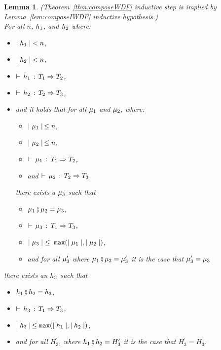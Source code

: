 \documentclass[acmtog, authorversion, acmlarge]{acmart}
\newtheorem{lem}{Lemma}
\begin{document}
\begin{lem}
  \label{lem:thm:help}
  (Theorem~\ref{thm:composeWDF} inductive step is implied by Lemma~\ref{lem:composeIWDF} inductive hypothesis.)\\
  For all $n$, $h_1$, and $h_2$ where:
  \begin{itemize}
  \item $\mid h_1 \mid \; < n$,
  \item $\mid h_2 \mid \; < n$, 
  \item $\vdash \, h_1 \, : \, T_1 \Rightarrow T_2$,
  \item $\vdash \, h_2 \, : \, T_2 \Rightarrow T_3$,
  \item and it holds that for all $\mu_1$ and $\mu_2$, where:
    \begin{itemize}
    \item $\mid \mu_1 \mid \, \le n$,
    \item $\mid \mu_2 \mid \, \le n$,
    \item $\vdash \, \mu_1 \, : \, T_1 \Rightarrow T_2$,
    \item and $\vdash \, \mu_2 \, : \, T_2 \Rightarrow T_3$
    \end{itemize}
    there exists a $\mu_3$ such that
    \begin{itemize}
    \item $\mu_1 \fatsemi \mu_2 = \mu_3$,
    \item $\vdash \, \mu_3 \, : \, T_1 \Rightarrow T_3$,
    \item $\mid \mu_3 \mid \; \le \; \texttt{max}(\mid \mu_1 \mid, \mid \mu_2 \mid)$,
    \item and for all $\mu_{3}^{\prime}$ where $\mu_1 \fatsemi \mu_2 = \mu_{3}^{\prime}$
      it is the case that $\mu_{3}^{\prime} = \mu_{3}$
    \end{itemize}
  \end{itemize}
  there exists an $h_3$ such that
  \begin{itemize}
  \item $h_1 \fatsemi h_2 = h_3$,
  \item $\vdash \, h_3 \, : \, T_1 \Rightarrow T_3$,
  \item $\mid h_3 \mid \, \le \texttt{max}(\mid h_1 \mid, \mid h_2 \mid)$,
  \item and for all $H_{3}^{\prime}$, where $h_1 \fatsemi h_2 = H_{3}^{\prime}$
    it is the case that $H_{3}^{\prime} = H_{3}$.
  \end{itemize}
\end{lem}
\end{document}
